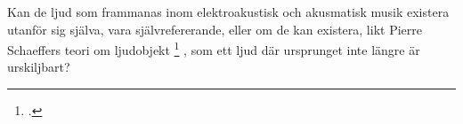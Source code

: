 \documentclass{article}
\begin{document}
%

Kan de ljud som frammanas inom elektroakustisk och akusmatisk musik existera utanför sig
själva, vara självrefererande, eller om de kan existera, likt Pierre Schaeffers teori om
ljudobjekt
\footcite{PierreSchaeffer}
, som ett ljud där ursprunget inte längre är urskiljbart? 
\end{document}
